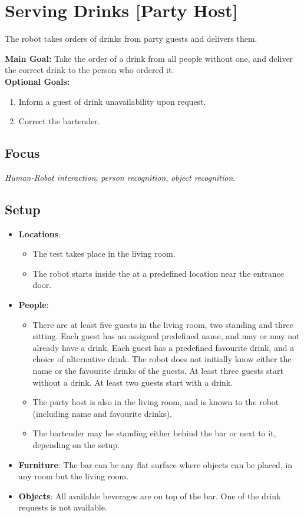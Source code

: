\section{Serving Drinks [Party Host]}
\label{test:serving-drinks}
The robot takes orders of drinks from party guests and delivers them.

\noindent \textbf{Main Goal:} Take the order of a drink from all people without one, and deliver the correct drink to the person who ordered it.\\

\noindent \textbf{Optional Goals:}
\begin{enumerate}[nosep]
	\item Inform a guest of drink unavailability upon request.
	\item Correct the bartender.
\end{enumerate}

\subsection*{Focus}
\emph{Human-Robot interaction}, \emph{person recognition}, \emph{object recognition}.

\subsection*{Setup}
\begin{itemize}
	\item \textbf{Locations}: 
		\begin{itemize} 
			\item The test takes place in the living room.
			\item The robot starts inside the \Arena{} at a predefined location near the entrance door.
		\end{itemize}
	\item \textbf{People}:
		\begin{itemize} 			
			\item There are at least five guests in the living room, two standing and three sitting. Each guest has an assigned predefined name, and may or may not already have a drink. Each guest has a predefined favourite drink, and a choice of alternative drink. The robot does not initially know either the name or the favourite drinks of the guests. At least three guests start without a drink. At least two guests start with a drink.
			\item The party host is also in the living room, and is known to the robot (including name and favourite drinks).
			\item The bartender may be standing either behind the bar or next to it, depending on the \Arena{} setup.
		\end{itemize}
	\item \textbf{Furniture}: The bar can be any flat surface where objects can be placed, in any room but the living room.
	\item \textbf{Objects}: All available beverages are on top of the bar. One of the drink requests is not available.
\end{itemize}

